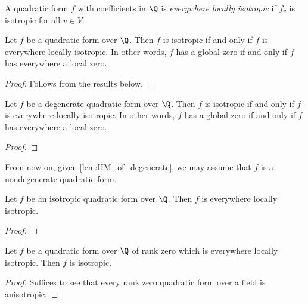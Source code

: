 \begin{definition}\label{def:everywhere_locally_isotropic}
\leanok
A quadratic form $f$ with coefficients in $\Q$ is \emph{everywhere locally isotropic} if $f_v$ is isotropic for all $v \in V$.
\end{definition}

\begin{theorem}\label{thm:Hasse--Minkowski}
\leanok
Let $f$ be a quadratic form over $\Q$. Then $f$ is isotropic if and only if $f$ is everywhere locally isotropic. In other words, $f$ has a global zero if and only if $f$ has everywhere a local zero. 
\end{theorem}
\begin{proof}
Follows from the results below.
\end{proof}

\begin{theorem}\label{lem:HM_of_degenerate}
	\leanok
	Let $f$ be a degenerate quadratic form over $\Q$. Then $f$ is isotropic if and only if $f$ is everywhere locally isotropic. In other words, $f$ has a global zero if and only if $f$ has everywhere a local zero. 
\end{theorem}
\begin{proof}
	
\end{proof}

From now on, given \ref{lem:HM_of_degenerate}, we may assume that $f$ is a nondegenerate quadratic form.

\begin{lemma}\label{lem:ev_loc_isotr_of_isotr}
\leanok
Let $f$ be an isotropic quadratic form over $\Q$. Then $f$ is everywhere locally isotropic.
\end{lemma}
\begin{proof}
	
\end{proof}

\begin{lemma}\label{lem:isotr_of_rk_zero}
	\leanok
	Let $f$ be a quadratic form over $\Q$ of rank zero which is everywhere locally isotropic. Then $f$ is isotropic.
\end{lemma}
\begin{proof}
Suffices to see that every rank zero quadratic form over a field is anisotropic.
\end{proof}

